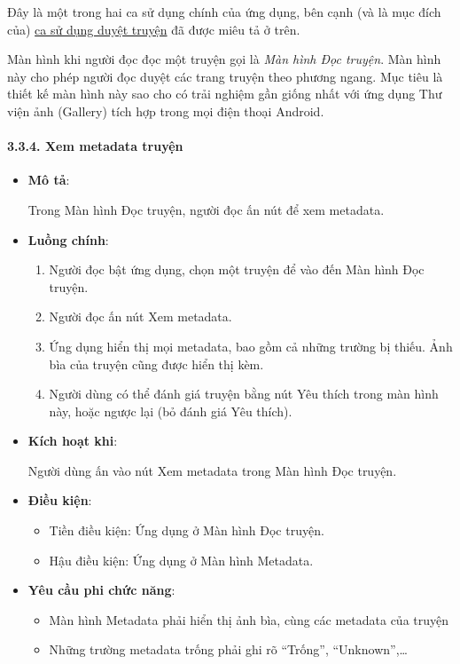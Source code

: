 \documentclass[
]{article}
\providecommand{\tightlist}{%
  \setlength{\itemsep}{0pt}\setlength{\parskip}{0pt}}
\begin{document}
Đây là một trong hai ca sử dụng chính của ứng dụng, bên cạnh (và là mục
đích của) \protect\hyperlink{P3.3.2-browsing}{ca sử dụng duyệt truyện}
đã được miêu tả ở trên.

Màn hình khi người đọc đọc một truyện gọi là \emph{Màn hình Đọc truyện}.
Màn hình này cho phép người đọc duyệt các trang truyện theo phương
ngang. Mục tiêu là thiết kế màn hình này sao cho có trải nghiệm gần
giống nhất với ứng dụng Thư viện ảnh (Gallery) tích hợp trong mọi điện
thoại Android.

\hypertarget{xem-metadata-truyux1ec7n}{%
\paragraph{\texorpdfstring{3.3.4. Xem metadata truyện
}{3.3.4. Xem metadata truyện }}\label{xem-metadata-truyux1ec7n}}

\begin{itemize}
\item
  \textbf{Mô tả}:

  Trong Màn hình Đọc truyện, người đọc ấn nút để xem metadata.
\item
  \textbf{Luồng chính}:

  \begin{enumerate}
  \def\labelenumi{\arabic{enumi}.}
  \tightlist
  \item
    Người đọc bật ứng dụng, chọn một truyện để vào đến Màn hình Đọc
    truyện.
  \item
    Người đọc ấn nút Xem metadata.
  \item
    Ứng dụng hiển thị mọi metadata, bao gồm cả những trường bị thiếu.
    Ảnh bìa của truyện cũng được hiển thị kèm.
  \item
    Người dùng có thể đánh giá truyện bằng nút Yêu thích trong màn hình
    này, hoặc ngược lại (bỏ đánh giá Yêu thích).
  \end{enumerate}
\item
  \textbf{Kích hoạt khi}:

  Người dùng ấn vào nút Xem metadata trong Màn hình Đọc truyện.
\item
  \textbf{Điều kiện}:

  \begin{itemize}
  \tightlist
  \item
    Tiền điều kiện: Ứng dụng ở Màn hình Đọc truyện.
  \item
    Hậu điều kiện: Ứng dụng ở Màn hình Metadata.
  \end{itemize}
\item
  \textbf{Yêu cầu phi chức năng}:

  \begin{itemize}
  \tightlist
  \item
    Màn hình Metadata phải hiển thị ảnh bìa, cùng các metadata của
    truyện
  \item
    Những trường metadata trống phải ghi rõ ``Trống'',
    ``Unknown'',\ldots{}
  \end{itemize}
\end{itemize}
\end{document}
